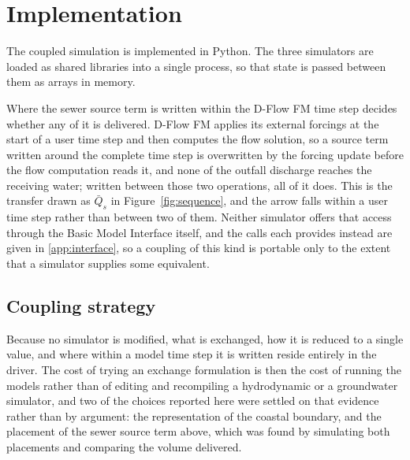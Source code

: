 \documentclass[preprint,authoryear,11pt]{elsarticle}
\begin{document}
\section{Implementation}
\label{sec:implementation}


The coupled simulation is implemented in Python. The three simulators are loaded as shared libraries into a single process, so that state is passed between them as arrays in memory.

Where the sewer source term is written within the D-Flow FM time step decides whether any of it is delivered. D-Flow FM applies its external forcings at the start of a user time step and then computes the flow solution, so a source term written around the complete time step is overwritten by the forcing update before the flow computation reads it, and none of the outfall discharge reaches the receiving water; written between those two operations, all of it does. This is the transfer drawn as $\bar{Q}_s$ in Figure~\ref{fig:sequence}, and the arrow falls within a user time step rather than between two of them. Neither simulator offers that access through the Basic Model Interface itself, and the calls each provides instead are given in \ref{app:interface}, so a coupling of this kind is portable only to the extent that a simulator supplies some equivalent.

\subsection{Coupling strategy}

Because no simulator is modified, what is exchanged, how it is reduced to a single value, and where within a model time step it is written reside entirely in the driver. The cost of trying an exchange formulation is then the cost of running the models rather than of editing and recompiling a hydrodynamic or a groundwater simulator, and two of the choices reported here were settled on that evidence rather than by argument: the representation of the coastal boundary, and the placement of the sewer source term above, which was found by simulating both placements and comparing the volume delivered.
\end{document}
